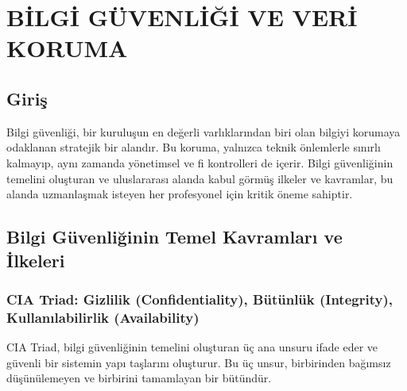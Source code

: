 \chapter{BİLGİ GÜVENLİĞİ VE VERİ KORUMA}

\section*{Giriş}
Bilgi güvenliği, bir kuruluşun en değerli varlıklarından biri olan bilgiyi korumaya odaklanan stratejik bir alandır. Bu koruma, yalnızca teknik önlemlerle sınırlı kalmayıp, aynı zamanda yönetimsel ve fi kontrolleri de içerir. Bilgi güvenliğinin temelini oluşturan ve uluslararası alanda kabul görmüş ilkeler ve kavramlar, bu alanda uzmanlaşmak isteyen her profesyonel için kritik öneme sahiptir.

\section{Bilgi Güvenliğinin Temel Kavramları ve İlkeleri}

\subsection{CIA Triad: Gizlilik (Confidentiality), Bütünlük (Integrity), Kullanılabilirlik (Availability)}

CIA Triad, bilgi güvenliğinin temelini oluşturan üç ana unsuru ifade eder ve güvenli bir sistemin yapı taşlarını oluşturur. Bu üç unsur, birbirinden bağımsız düşünülemeyen ve birbirini tamamlayan bir bütündür.

